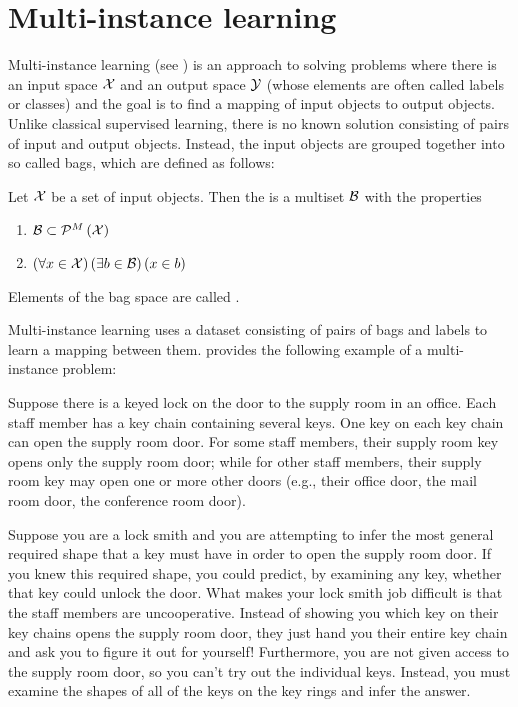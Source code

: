 \section{Multi-instance learning}
Multi-instance learning (see \cite{dietterich_solving_1997}) is an approach to solving problems where there is an input space \( \mathcal{X} \) and an output space \( \mathcal{Y} \) (whose elements are often called labels or classes) and the goal is to find a mapping of input objects to output objects. Unlike classical supervised learning, there is no known solution consisting of pairs of input and output objects. Instead, the input objects are grouped together into so called bags, which are defined as follows:

\begin{define}
	Let \( \mathcal{X} \) be a set of input objects. Then the  is a multiset \( \mathcal{B} \) with the properties
	\begin{enumerate}
		\item \( \mathcal{B} \subset \mathcal{P}^M \left( \mathcal{X} \right) \)
		\item \( \left( \forall x \in \mathcal{X} \right) \left( \exists b \in \mathcal{B} \right) \left( x \in b \right) \)
	\end{enumerate}
	Elements of the bag space are called .
\end{define}

Multi-instance learning uses a dataset consisting of pairs of bags and labels to learn a mapping between them. \cite{dietterich_solving_1997} provides the following example of a multi-instance problem:

\begin{example}
	Suppose there is a keyed lock on the door to the supply room in an office. Each staff member has a key chain containing several keys. One key on each key chain can open the supply room door. For some staff members, their supply room key opens only the supply room door; while for other staff members, their supply room key may open one or more other doors (e.g., their office door, the mail room door, the conference room door). 

	Suppose you are a lock smith and you are attempting to infer the most general required shape that a key must have in order to open the supply room door. If you knew this required shape, you could predict, by examining any key, whether that key could unlock the door. What makes your lock smith job difficult is that the staff members are uncooperative. Instead of showing you which key on their key chains opens the supply room door, they just hand you their entire key chain and ask you to figure it out for yourself! Furthermore, you are not given access to the supply room door, so you can’t try out the individual keys. Instead, you must examine the shapes of all of the keys on the key rings and infer the answer. 
\end{example}

